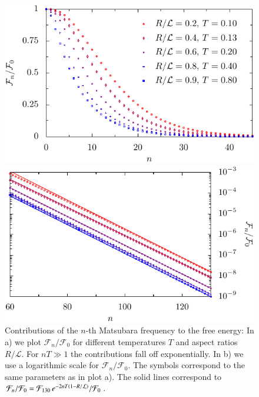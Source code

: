 \begin{figure}
  \begin{minipage}[b]{.5\linewidth}
  \centering
  \includegraphics[scale=0.78]{plots/numeric/sumn/n.pdf}
  \end{minipage}%
  \begin{minipage}[b]{.5\linewidth}
  \centering
  \includegraphics[scale=0.78]{plots/numeric/sumn/n_log.pdf}
  \end{minipage}

  \caption{Contributions of the $n$-th Matsubara frequency to the free energy:
  In a) we plot $\mathcal{F}_n/\mathcal{F}_0$ for different temperatures $T$ and
  aspect ratios $R/\mathcal{L}$. For $nT\gg1$ the contributions fall off exponentially.
  In b) we use a logarithmic scale for $\mathcal{F}_n/\mathcal{F}_0$. The symbols correspond to
  the same parameters as in plot a). 
  The solid lines correspond to $\mathcal{F}_n/\mathcal{F}_0 = \mathcal{F}_{130} \, e^{-2nT\left(1-R/\mathcal{L}\right)}/\mathcal{F}_0$.}
  \label{fig:numeric_sumn}
\end{figure}

